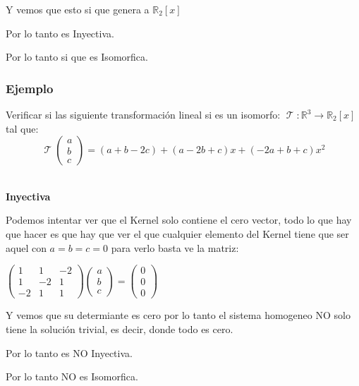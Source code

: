 \documentclass[12pt]{report}                                %
\DeclareMathOperator \LinealTransformation {\mathcal{T}}
\begin{document}
            Y vemos que esto si que genera a $\mathbb{R}_2[x]$

            Por lo tanto es Inyectiva.  

            Por lo tanto si que es Isomorfica.   


            \clearpage
            \subsubsection{Ejemplo}
            Verificar si las siguiente transformación lineal si es un isomorfo:
            $\LinealTransformation : \mathbb{R}^3 \to \mathbb{R}_2[x]$ tal que: 
            \begin{equation*}
                \LinealTransformation(\begin{matrix}a\\b\\c\end{matrix}) = (a+b-2c)+(a-2b+c)x+(-2a+b+c)x^2
            \end{equation*}

            \textbf{\\Inyectiva}

            Podemos intentar ver que el Kernel solo contiene el cero vector, todo lo que hay que hacer es
            que hay que ver el que cualquier elemento del Kernel tiene que ser aquel con $a=b=c=0$
            para verlo basta ve la matriz:

            $\begin{pmatrix}1&1&-2\\1&-2&1\\-2&1&1\end{pmatrix} \begin{pmatrix}a\\b\\c\end{pmatrix}=
                \begin{pmatrix}0\\0\\0\end{pmatrix}$

            Y vemos que su determiante es cero por lo tanto el sistema homogeneo NO solo
            tiene la solución trivial, es decir, donde todo es cero.

            Por lo tanto es NO Inyectiva.

            Por lo tanto NO es Isomorfica.
\end{document}
